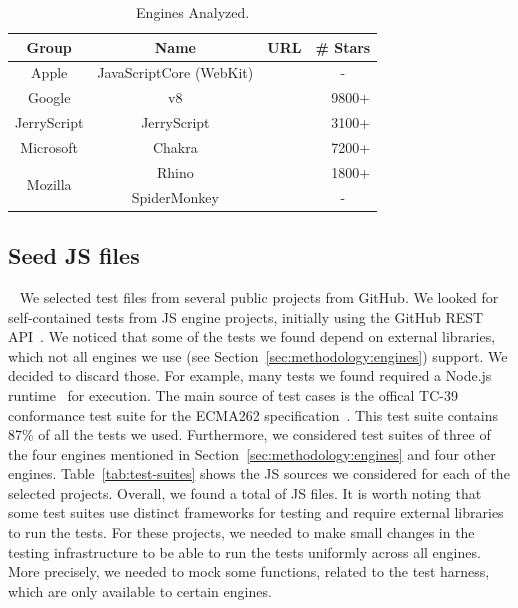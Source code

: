 \documentclass[10pt,conference,anonymous]{IEEEtran}
\begin{document}
\begin{table}[t]
  \centering
  \caption{\label{tab:engines}Engines Analyzed.}
  \begin{tabular}{cccr}
    \toprule
    Group & Name & URL & \# Stars \\
    \midrule
    Apple & JavaScriptCore (WebKit) & \cite{jsc2018repo} & \multicolumn{1}{c}{-} \\
    Google & v8 & \cite{v82018repo} & 9800+ \\
    JerryScript & JerryScript & \cite{jerryscript2018repo} & 3100+ \\
    Microsoft & Chakra & \cite{chakra2018repo} & 7200+ \\
    \midrule
    \multirow{2}{*}{Mozilla} & Rhino & \cite{rhino2018repo} & 1800+ \\
    & SpiderMonkey & \cite{spidermonkey2018repo} & \multicolumn{1}{c}{-} \\
   \bottomrule     
  \end{tabular}
\end{table}

\subsection{Seed JS files\label{sec:seeds}}~
We selected test files from several public projects from GitHub. We
looked for self-contained tests from JS engine projects, initially
using the GitHub REST API~\cite{github-rest-api}. We noticed that some
of the tests we found depend on external libraries, which not all
engines we use (see Section~\ref{sec:methodology:engines}) support. We
decided to discard those. For example, many tests we found required a
Node.js runtime~\cite{node} for execution. The main source of test
cases is the offical TC-39~\cite{tc39-github} conformance test suite
for the ECMA262 specification~\cite{ecmas262-spec}. This test suite
contains 87\% of all the tests we used. Furthermore, we
considered test suites of three of the four engines mentioned in
Section~\ref{sec:methodology:engines} and four other engines.
Table~\ref{tab:test-suites} shows the JS sources we considered for
each of the selected projects. Overall, we found a total of
\totfiles{} JS files. It is worth noting that some test suites use
distinct frameworks for testing and require external libraries to run
the tests.  For these projects, we needed to make small
changes in the testing infrastructure to be able to run the tests
uniformly across all engines. More precisely, we needed to mock
some functions, related to the test harness, which are only available to
certain engines.
\end{document}
